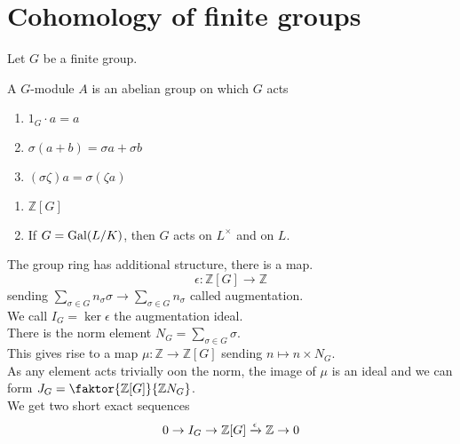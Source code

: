\documentclass[../main.tex]{subfiles}
\begin{document}
\section{Cohomology of finite groups}
Let $G$ be a finite group.\\
\begin{defn}
	A $G$-module $A$ is an abelian group on which $G$ acts
	\begin{enumerate}
	\item $1_G\cdot a =a $ 
	\item $\sigma( a+ b) = \sigma a  + \sigma b$ 
	\item $( \sigma\zeta) a = \sigma( \zeta a ) $ 
	\end{enumerate}
\end{defn}
\begin{exemple}
\begin{enumerate}
	\item $ \mathbb{Z}[G]$ 
	\item If $G= \operatorname{Gal}( L /K) $, then $G$ acts on $L^{\times}$ and on $L$.
\end{enumerate}
\end{exemple}
The group ring has additional structure, there is a map.
\[ 
	\epsilon: \mathbb{Z}[G] \to \mathbb{Z}
\]
sending $ \sum_{\sigma \in G} n_{\sigma} \sigma\to \sum_{\sigma \in G} n_\sigma$ called augmentation.\\
We call $I_G= \ker \epsilon$ the augmentation ideal.\\
There is the norm element $N_G = \sum_{\sigma\in G} \sigma$.\\
This gives rise to a map $\mu: \mathbb{Z}\to \mathbb{Z}[G]$ sending $n \mapsto n \times N_G$.\\
As any element acts trivially oon the norm, the image of $ \mu$ is an ideal and we can form $J_G= \faktor{\mathbb{Z}[G]}{\mathbb{Z}N_G}$.\\
We get two short exact sequences
\[ 
	0 \to I_G \to \mathbb{Z}[G]\xrightarrow{\epsilon} \mathbb{Z}\to 0
\]
\end{document}
